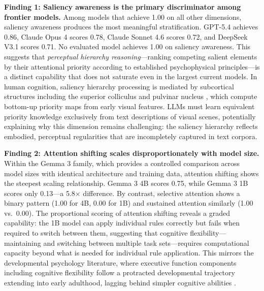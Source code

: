 \documentclass{article}
\begin{document}
\textbf{Finding 1: Saliency awareness is the primary discriminator among frontier models.} Among models that achieve 1.00 on all other dimensions, saliency awareness produces the most meaningful stratification. GPT-5.4 achieves 0.86, Claude Opus 4 scores 0.78, Claude Sonnet 4.6 scores 0.72, and DeepSeek V3.1 scores 0.71. No evaluated model achieves 1.00 on saliency awareness. This suggests that \emph{perceptual hierarchy reasoning}---ranking competing salient elements by their attentional priority according to established psychophysical principles---is a distinct capability that does not saturate even in the largest current models. In human cognition, saliency hierarchy processing is mediated by subcortical structures including the superior colliculus and pulvinar nucleus \citep{itti2001}, which compute bottom-up priority maps from early visual features. LLMs must learn equivalent priority knowledge exclusively from text descriptions of visual scenes, potentially explaining why this dimension remains challenging: the saliency hierarchy reflects embodied, perceptual regularities that are incompletely captured in text corpora.

\textbf{Finding 2: Attention shifting scales disproportionately with model size.} Within the Gemma 3 family, which provides a controlled comparison across model sizes with identical architecture and training data, attention shifting shows the steepest scaling relationship. Gemma 3 4B scores 0.75, while Gemma 3 1B scores only 0.13---a 5.8$\times$ difference. By contrast, selective attention shows a binary pattern (1.00 for 4B, 0.00 for 1B) and sustained attention similarly (1.00 vs.\ 0.00). The proportional scoring of attention shifting reveals a graded capability: the 1B model can apply individual rules correctly but fails when required to switch between them, suggesting that cognitive flexibility---maintaining and switching between multiple task sets---requires computational capacity beyond what is needed for individual rule application. This mirrors the developmental psychology literature, where executive function components including cognitive flexibility follow a protracted developmental trajectory extending into early adulthood, lagging behind simpler cognitive abilities \citep{diamond2013,kuhl2004}.
\end{document}
